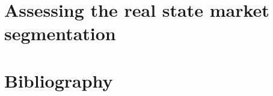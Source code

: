 \documentclass[
	10pt, %
	a4paper,
]{LegrandOrangeBook}
\begin{document}
\chapter{Assessing the real state market segmentation}


\stopcontents[part] %


\chapterimage{} %
\chapterspaceabove{2.5cm} %
\chapterspacebelow{2cm} %


\chapter*{Bibliography}
\printbibliography






\end{document}

